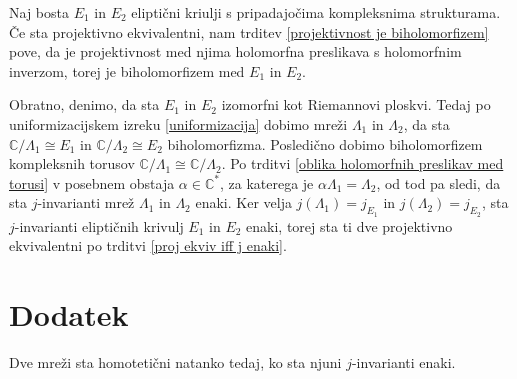 \documentclass[mat1]{fmfdelo}
\numberwithin{equation}{section}
\newcommand{\C}{\mathbb C}
\newcommand{\CM}{\mathbb C ^*}
\newcommand{\iso}{\cong}
\theoremstyle{definition}
\begin{document}
\begin{dokaz}
    Naj bosta $E_1$ in $E_2$ eliptični kriulji s pripadajočima kompleksnima strukturama. Če sta projektivno ekvivalentni, nam trditev \ref{projektivnost je biholomorfizem} pove, da je projektivnost med njima holomorfna preslikava s holomorfnim inverzom, torej je biholomorfizem med $E_1$ in $E_2$.

    Obratno, denimo, da sta $E_1$ in $E_2$ izomorfni kot Riemannovi ploskvi. Tedaj po uniformizacijskem izreku \ref{uniformizacija} dobimo mreži $\Lambda_1$ in $\Lambda_2$, da sta $\C/\Lambda_1 \iso E_1$ in $\C/\Lambda_2 \iso E_2$ biholomorfizma. Posledično dobimo biholomorfizem kompleksnih torusov $\C/\Lambda_1 \iso \C/\Lambda_2$. Po trditvi \ref{oblika holomorfnih preslikav med torusi} v posebnem obstaja $\alpha \in \CM$, za katerega je $\alpha\Lambda_1 = \Lambda_2$, od tod pa sledi, da sta $j$-invarianti mrež $\Lambda_1$ in $\Lambda_2$ enaki. Ker velja $j(\Lambda_1) = j_{E_1}$ in $j(\Lambda_2) = j_{E_2}$, sta $j$-invarianti eliptičnih krivulj $E_1$ in $E_2$ enaki, torej sta ti dve projektivno ekvivalentni po trditvi \ref{proj ekviv iff j enaki}.
\end{dokaz}


\section{Dodatek}

\begin{trditev}
    \label{ekvivalentni mrezi -- isti j}
    Dve mreži sta homotetični natanko tedaj, ko sta njuni $j$-invarianti enaki. 
\end{trditev}
\end{document}
